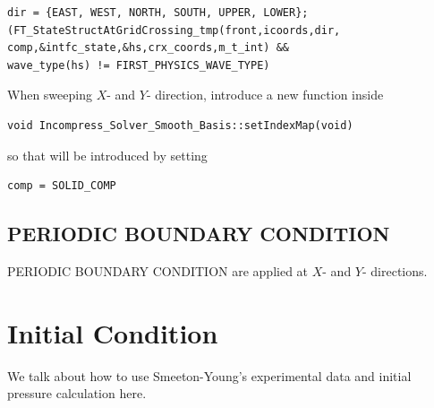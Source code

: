 \documentclass{article}
\numberwithin{equation}{subsection}
\begin{document}
\begin{lstlisting}[frame=single]
dir = {EAST, WEST, NORTH, SOUTH, UPPER, LOWER};
(FT_StateStructAtGridCrossing_tmp(front,icoords,dir,
comp,&intfc_state,&hs,crx_coords,m_t_int) &&
wave_type(hs) != FIRST_PHYSICS_WAVE_TYPE)
\end{lstlisting}

When sweeping $X$- and $Y$- direction, introduce a new function inside
\begin{lstlisting}[frame=single]
void Incompress_Solver_Smooth_Basis::setIndexMap(void)
\end{lstlisting}

so that  will be introduced by setting
\begin{lstlisting}[frame=single]
comp = SOLID_COMP
\end{lstlisting}

\subsection{PERIODIC BOUNDARY CONDITION}
PERIODIC BOUNDARY CONDITION are applied at $X$- and $Y$- directions.


\goodbreak
\newpage
\section{Initial Condition}
We talk about how to use Smeeton-Young's experimental data and initial pressure calculation here.

\end{document}
